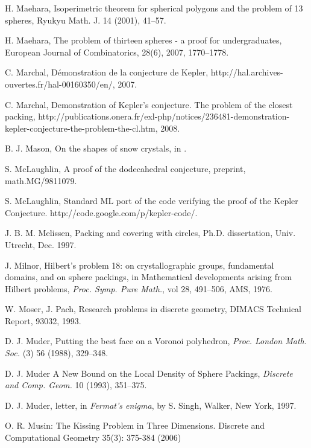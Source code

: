 \begin{thebibliography}{CHMS94}
 H. Maehara, Isoperimetric theorem for spherical
polygons and the problem of 13 spheres, Ryukyu Math. J. 14 (2001), 41--57.

 H. Maehara, The problem of thirteen spheres - a proof for undergraduates, European Journal of Combinatorics, 28(6), 2007,
1770--1778.

 C. Marchal, D\'emonstration de la conjecture de Kepler,
http://hal.archives-ouvertes.fr/hal-00160350/en/, 2007.

 C. Marchal, Demonstration of Kepler's conjecture. The problem of the closest packing, http://publications.onera.fr/exl-php/notices/236481-demonstration-kepler-conjecture-the-problem-the-cl.htm, 2008.

 B. J. Mason, On the shapes of snow crystals, in \cite{Kep66}.

 S. McLaughlin, A proof of the dodecahedral conjecture,
    preprint, math.MG/9811079.

 S. McLaughlin, Standard ML port of the code
verifying the proof of the Kepler Conjecture.
http://code.google.com/p/kepler-code/.

 J. B. M. Melissen, Packing and covering with circles,
    Ph.D. dissertation, Univ. Utrecht, Dec. 1997.

 J. Milnor, Hilbert's problem 18: on crystallographic groups,
    fundamental domains, and on sphere packings, in
    Mathematical developments arising from Hilbert problems,
    {\it Proc. Symp. Pure Math.}, vol 28, 491--506, AMS, 1976.

 W. Moser, J. Pach, Research problems in discrete geometry,
    DIMACS Technical Report, 93032, 1993.

 D. J. Muder, Putting the best face on a Voronoi polyhedron,
    {\it Proc. London Math. Soc.} (3) 56 (1988), 329--348.


  D. J. Muder A New Bound on the Local Density
of Sphere Packings, {\it Discrete and Comp. Geom.} 10 (1993),
351--375.

  D. J. Muder, letter, in {\it Fermat's enigma}, by S. Singh,
        Walker, New York, 1997.

  O. R. Musin: The Kissing Problem in Three Dimensions. Discrete and Computational Geometry 35(3): 375-384 (2006)


\end{thebibliography}
